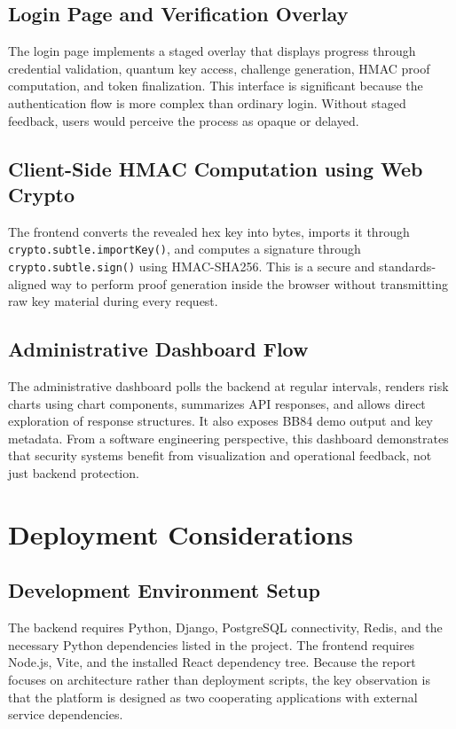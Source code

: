 \subsection{Login Page and Verification Overlay}
The login page implements a staged overlay that displays progress through credential validation, quantum key access, challenge generation, HMAC proof computation, and token finalization. This interface is significant because the authentication flow is more complex than ordinary login. Without staged feedback, users would perceive the process as opaque or delayed.

\subsection{Client-Side HMAC Computation using Web Crypto}
The frontend converts the revealed hex key into bytes, imports it through \texttt{crypto.subtle.importKey()}, and computes a signature through \texttt{crypto.subtle.sign()} using HMAC-SHA256. This is a secure and standards-aligned way to perform proof generation inside the browser without transmitting raw key material during every request.

\subsection{Administrative Dashboard Flow}
The administrative dashboard polls the backend at regular intervals, renders risk charts using chart components, summarizes API responses, and allows direct exploration of response structures. It also exposes BB84 demo output and key metadata. From a software engineering perspective, this dashboard demonstrates that security systems benefit from visualization and operational feedback, not just backend protection.

\section{Deployment Considerations}

\subsection{Development Environment Setup}
The backend requires Python, Django, PostgreSQL connectivity, Redis, and the necessary Python dependencies listed in the project. The frontend requires Node.js, Vite, and the installed React dependency tree. Because the report focuses on architecture rather than deployment scripts, the key observation is that the platform is designed as two cooperating applications with external service dependencies.

